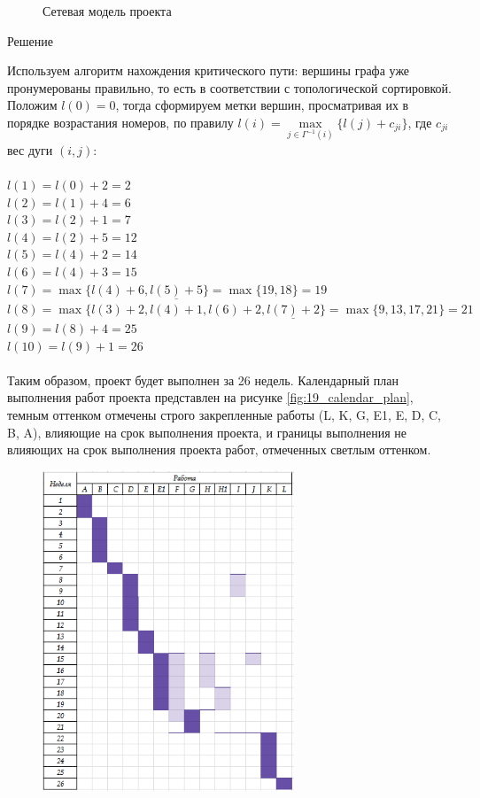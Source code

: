 \documentclass{article}
\begin{document}
\begin{enumerate}
\begin{figure}[ht]
    \caption{Сетевая модель проекта}
    \label{fig:19_graph}
\end{figure}
\begin{center}
Решение 
\end{center}
Используем алгоритм нахождения критического пути: вершины графа уже пронумерованы правильно, то есть в соответствии с топологической сортировкой.\\
Положим $l(0) = 0$, тогда сформируем метки вершин, просматривая их в порядке возрастания номеров, по правилу $l(i)=\max\limits_{j \in \Gamma^{-1}(i)} \{l(j) + c_{ji}\}$, где $c_{ji}$ \quad\textemdash\quad вес дуги $(i, j)$:
\\
\\
$l(1) = l(0) + 2 = 2$\\
$l(2) = l(1) + 4 = 6$\\
$l(3) = l(2) + 1 = 7$\\
$l(4) = l(2) + 5 = 12$\\
$l(5) = l(4) + 2 = 14$\\
$l(6) = l(4) + 3 = 15$\\
$l(7) = \max\{l(4) + 6,\underline{l(5) + 5}\} = \max\{19, 18\} = 19$\\
$l(8) = \max\{l(3)+2,l(4) + 1,l(6)+2, \underline{l(7) + 2}\} = \max\{9, 13, 17, 21\} = 21$\\
$l(9) = l(8) + 4 = 25$\\
$l(10) = l(9) + 1 = 26$\\
\\
Таким образом, проект будет выполнен за 26 недель. Календарный план выполнения работ проекта представлен на рисунке \ref{fig:19_calendar_plan}, темным оттенком отмечены строго закрепленные работы (L, K, G, E1, E, D, C, B, A), влияющие на срок выполнения проекта, и границы выполнения не влияющих на срок выполнения проекта работ, отмеченных светлым оттенком.
\begin{figure}[ht]
    \centering
    \includegraphics[width=0.67\textwidth, center]{attachments/19/19_3.png}

\end{figure}
\end{enumerate}
\end{document}
